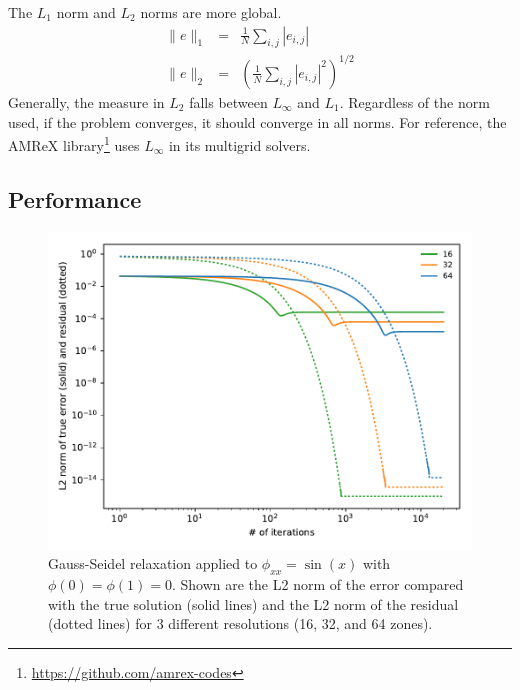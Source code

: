 The $L_1$ norm and $L_2$ norms are more global. 
\begin{eqnarray}
\|e\|_1 &=& \frac{1}{N} \sum_{i,j} |e_{i,j} | \\
\|e\|_2 &=& \left ( \frac{1}{N} \sum_{i,j} |e_{i,j} |^2 \right )^{1/2}
\end{eqnarray}
Generally, the measure in $L_2$ falls between $L_\infty$ and $L_1$.
Regardless of the norm used, if the problem converges, it should
converge in all norms.  For reference, the AMReX
library\footnote{\url{https://github.com/amrex-codes}} uses $L_\infty$
in its multigrid solvers.



\subsection{Performance}


\begin{figure}
\centering
\includegraphics[width=\linewidth]{smooth-error}
\caption[Convergence as a function of number of iterations using Gauss-Seidel relaxation]{\label{fig:smootherror} Gauss-Seidel relaxation applied to
  $\phi_{xx} = \sin(x)$ with $\phi(0) = \phi(1) = 0$.  Shown are the
  L2 norm of the error compared with the true solution (solid lines)
  and the L2 norm of the residual (dotted lines) for 3 different
  resolutions (16, 32, and 64 zones). \\
  }
\end{figure}

